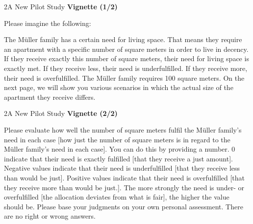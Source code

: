 \documentclass[xcolor=table,9pt,aspectratio=169]{beamer}
\begin{document}
\begin{frame}{\vspace*{10mm}2\hspace*{1em}A New Pilot Study}
   \textbf{Vignette (1/2)}
   
   \medskip
   Please imagine the following:
   
   \medskip
   The Müller family has a certain need for living space.
   That means they require an apartment with a specific number of square meters in order to live in decency.
   If they receive exactly this number of square meters, their need for living space is exactly met.
   If they receive less, their need is underfulfilled.
   If they receive more, their need is overfulfilled.
   The Müller family requires 100 square meters.
   On the next page, we will show you various scenarios in which the actual size of the apartment they receive differs.
\end{frame}


\begin{frame}{\vspace*{10mm}2\hspace*{1em}A New Pilot Study}
   \textbf{Vignette (2/2)}
   
   \medskip
   Please evaluate how well the number of square meters fulfil the Müller family's need in each case \textcolor{blue1}{[how just the number of square meters is in regard to the Müller family's need in each case]}.
   You can do this by providing a number.
   0 indicate that their need is exactly fulfilled \textcolor{blue1}{[that they receive a just amount]}.
   Negative values indicate that their need is underfulfilled \textcolor{blue1}{[that they receive less than would be just]}.
   Positive values indicate that their need is overfulfilled \textcolor{blue1}{[that they receive more than would be just.]}.
   The more strongly the need is under- or overfulfilled \textcolor{blue1}{[the allocation deviates from what is fair]}, the higher the value should be.
   Please base your judgments on your own personal assessment.
   There are no right or wrong answers.
\end{frame}
\end{document}
